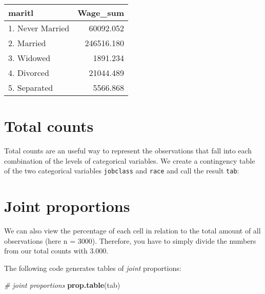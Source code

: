 \documentclass[
]{book}
\newenvironment{Shaded}{\begin{snugshade}}{\end{snugshade}}
\newcommand{\CommentTok}[1]{\textcolor[rgb]{0.56,0.35,0.01}{\textit{#1}}}
\newcommand{\KeywordTok}[1]{\textcolor[rgb]{0.13,0.29,0.53}{\textbf{#1}}}
\newcommand{\NormalTok}[1]{#1}
\newcommand{\OperatorTok}[1]{\textcolor[rgb]{0.81,0.36,0.00}{\textbf{#1}}}
\newcommand{\StringTok}[1]{\textcolor[rgb]{0.31,0.60,0.02}{#1}}
\begin{document}
\captionsetup[table]{labelformat=empty,skip=1pt}
\begin{longtable}{lr}
\toprule
maritl & Wage\_sum \\ 
\midrule
1. Never Married & 60092.052 \\ 
2. Married & 246516.180 \\ 
3. Widowed & 1891.234 \\ 
4. Divorced & 21044.489 \\ 
5. Separated & 5566.868 \\ 
\bottomrule
\end{longtable}

\hypertarget{total-counts}{%
\section{Total counts}\label{total-counts}}

Total counts are an useful way to represent the observations that fall into each combination of the levels of categorical variables. We create a contingency table of the two categorical variables \texttt{jobclass} and \texttt{race} and call the result \texttt{tab}:

\begin{Shaded}
\end{Shaded}

\hypertarget{joint-proportions}{%
\section{Joint proportions}\label{joint-proportions}}

We can also view the percentage of each cell in relation to the total amount of all observations (here n = 3000). Therefore, you have to simply divide the numbers from our total counts with 3.000.

The following code generates tables of \emph{joint} proportions:

\begin{Shaded}
\begin{Highlighting}[]
\CommentTok{\# joint proportions}
\KeywordTok{prop.table}\NormalTok{(tab)}
\end{Highlighting}
\end{Shaded}
\end{document}
